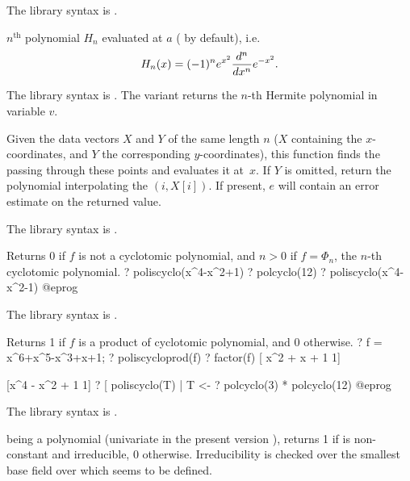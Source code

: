The library syntax is .

\label{se:polhermite}
$n^{\text{th}}$  polynomial $H_n$ evaluated at $a$
( by default), i.e.
$$ H_n(x) = (-1)^n\*e^{x^2} \dfrac{d^n}{dx^n}e^{-x^2}.$$

The library syntax is .
The variant  returns the $n$-th
Hermite polynomial in variable $v$.

\label{se:polinterpolate}
Given the data vectors
$X$ and $Y$ of the same length $n$ ($X$ containing the $x$-coordinates,
and $Y$ the corresponding $y$-coordinates), this function finds the
 passing through these points and evaluates it
at~$x$. If $Y$ is omitted, return the polynomial interpolating the
$(i,X[i])$. If present, $e$ will contain an error estimate on the returned
value.

The library syntax is .

\label{se:poliscyclo}
Returns 0 if $f$ is not a cyclotomic polynomial, and $n > 0$ if $f =
\Phi_n$, the $n$-th cyclotomic polynomial.
\bprog
? poliscyclo(x^4-x^2+1)
? polcyclo(12)
? poliscyclo(x^4-x^2-1)
@eprog

The library syntax is .

\label{se:poliscycloprod}
Returns 1 if $f$ is a product of cyclotomic polynomial, and $0$
otherwise.
\bprog
? f = x^6+x^5-x^3+x+1;
? poliscycloprod(f)
? factor(f)
[  x^2 + x + 1 1]

[x^4 - x^2 + 1 1]
? [ poliscyclo(T) | T <- %
? polcyclo(3) * polcyclo(12)
@eprog

The library syntax is .

\label{se:polisirreducible}
 being a polynomial (univariate in the present version \vers),
returns 1 if  is non-constant and irreducible, 0 otherwise.
Irreducibility is checked over the smallest base field over which 
seems to be defined.

